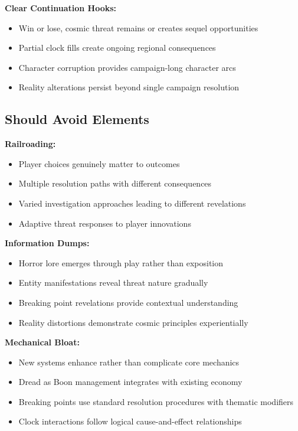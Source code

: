 \documentclass[11pt]{article}
\begin{document}
\textbf{Clear Continuation Hooks:}
\begin{itemize}
\item Win or lose, cosmic threat remains or creates sequel opportunities
\item Partial clock fills create ongoing regional consequences
\item Character corruption provides campaign-long character arcs
\item Reality alterations persist beyond single campaign resolution
\end{itemize}

\subsection{Should Avoid Elements}

\textbf{Railroading:}
\begin{itemize}
\item Player choices genuinely matter to outcomes
\item Multiple resolution paths with different consequences
\item Varied investigation approaches leading to different revelations
\item Adaptive threat responses to player innovations
\end{itemize}

\textbf{Information Dumps:}
\begin{itemize}
\item Horror lore emerges through play rather than exposition
\item Entity manifestations reveal threat nature gradually
\item Breaking point revelations provide contextual understanding
\item Reality distortions demonstrate cosmic principles experientially
\end{itemize}

\textbf{Mechanical Bloat:}
\begin{itemize}
\item New systems enhance rather than complicate core mechanics
\item Dread as Boon management integrates with existing economy
\item Breaking points use standard resolution procedures with thematic modifiers
\item Clock interactions follow logical cause-and-effect relationships
\end{itemize}
\end{document}

